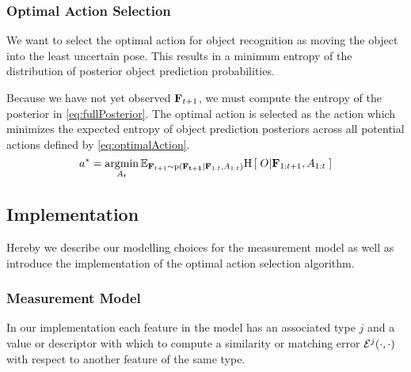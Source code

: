 \subsubsection{Optimal Action Selection}            
            
            We want to select the optimal action for object recognition as moving the object into the least uncertain pose. This results in a minimum entropy of the distribution of posterior object prediction probabilities. 

            Because we have not yet observed $\mathbf{F}_{t+1}$, we must compute the  entropy of the posterior in \eqref{eq:fullPosterior}. The optimal action is selected as the action which minimizes the expected entropy of object prediction posteriors across all potential actions defined by \eqref{eq:optimalAction}.
            {\small
            \begin{equation}
                \label{eq:optimalAction}
                a^* = \argmin_{A_t} \expectedValue{ \entropy{O|\set{F}_{1:t+1},A_{1:t}} }{\set{F}_{t+1} \sim \prob{\set{F_{t+1}}|\set{F}_{1:t},A_{1:t}}}
            \end{equation}
            }
            
    \subsection{Implementation}
Hereby we describe our modelling choices for the measurement model as well as introduce the implementation of the optimal action selection algorithm.
        \subsubsection{Measurement Model}

 
            In our implementation each feature in the model has an associated type $j$ and a value or descriptor with which to compute a similarity or matching error $\mathcal{E}^j(\cdot,\cdot)$ with respect to another feature of the same type.

